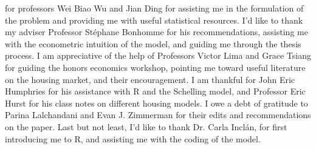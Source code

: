 
 for professors Wei Biao Wu and Jian Ding for assisting me in the formulation of the problem and providing me with useful statistical resources. I'd like to thank my adviser Professor St\'ephane Bonhomme for his recommendations, assisting me with the econometric intuition of the model, and guiding me through the thesis process. I am appreciative of the help of Professors Victor Lima and Grace Tsiang for guiding the honors economics workshop, pointing me toward useful literature on the housing market, and their encouragement. I am thankful for John Eric Humphries for his assistance with R and the Schelling model, and Professor Eric Hurst for his class notes on different housing models. I owe a debt of gratitude to Parina Lalchandani and Evan J. Zimmerman for their edits and recommendations on the paper. Last but not least, I'd like to thank Dr. Carla Incl\'an, for first introducing me to R, and assisting me with the coding of the model.